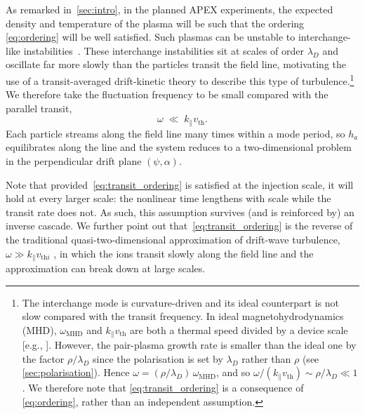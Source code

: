 \documentclass{jpp}
\newcommand{\lambdaD}{\lambda_D}
\begin{document}
As remarked in~\cref{sec:intro}, in the planned APEX experiments, the expected density and temperature of the plasma will be such that the ordering \cref{eq:ordering} will be well satisfied. Such plasmas can be unstable to interchange-like instabilities~\citep{Helander2014}. These interchange instabilities sit at scales of order $\lambdaD$ and oscillate far more slowly than the particles transit the field line, motivating the use of a transit-averaged drift-kinetic theory to describe this type of turbulence.\footnote{The interchange mode is curvature-driven and its ideal counterpart is not slow compared with the transit frequency. In ideal magnetohydrodynamics (MHD), $\omega_\mathrm{MHD}$ and $k_\parallel v_\mathrm{th}$ are both a thermal speed divided by a device scale [e.g., \citet{Zhang2026}]. However, the pair-plasma growth rate is smaller than the ideal one by the factor $\rho/\lambdaD$ since the polarisation is set by $\lambdaD$ rather than $\rho$ (see \cref{sec:polarisation}). Hence $\omega = (\rho/\lambdaD)\,\omega_\mathrm{MHD}$, and so $\omega/(k_\parallel v_\mathrm{th}) \sim \rho/\lambdaD \ll 1$. We therefore note that \cref{eq:transit_ordering} is a consequence of \cref{eq:ordering}, rather than an independent assumption.} We therefore take the fluctuation frequency to be small compared with the parallel transit,
\begin{equation}\label{eq:transit_ordering}
\omega \;\ll\; k_\parallel v_\mathrm{th}.
\end{equation}
Each particle streams along the field line many times within a mode period, so $h_a$ equilibrates along the line and the system reduces to a two-dimensional problem in the perpendicular drift plane $(\psi,\alpha)$. 

Note that provided~\cref{eq:transit_ordering} is satisfied at the injection scale, it will hold at every larger scale: the nonlinear time lengthens with scale while the transit rate does not. As such, this assumption survives (and is reinforced by) an inverse cascade. We further point out that~\cref{eq:transit_ordering} is the reverse of the traditional quasi-two-dimensional approximation of drift-wave turbulence, $\omega \gg k_\parallel v_{\mathrm{th}i}$ \citep{HasegawaMima1978}, in which the ions transit slowly along the field line and the approximation can break down at large scales.
\end{document}
